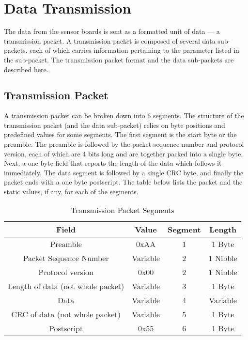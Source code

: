 \section{Data Transmission} \label{section:overall}

The data from the sensor boards is sent as a formatted unit of data --- a transmission
packet. A transmission packet is composed of several data sub-packets, each
of which carries information pertaining to the parameter listed in the sub-packet.
The transmission packet format and the data sub-packets are described here.

\subsection{Transmission Packet}
A transmission packet can be broken down into 6 segments.
The structure of the transmission packet (and the data sub-packet) relies on
byte positions and predefined values for some segments. The first segment
is the start byte or
the preamble. The preamble is followed by the packet sequence number and protocol
version, each of which are 4 bits long and are together packed into a single byte.
Next, a one byte field that reports the length of the data which follows it
immediately. The data segment is
followed by a single CRC byte, and finally the packet ends with a one byte
postscript. The table below lists the packet and the static values, if any,
for each of the segments.

\begin{table}[H]
    \centering
    {
    \begin{tabular}{|c|c|c|c|}
        \hline
        \textbf{Field} & \textbf{Value} & \textbf{Segment} & \textbf{Length}\\
        \hline
        \hline
        Preamble & 0xAA & 1 & 1 Byte\\
        Packet Sequence Number & Variable & 2 & 1 Nibble\\
        Protocol version & 0x00 & 2 & 1 Nibble\\
        Length of data (not whole packet) & Variable & 3 & 1 Byte\\
        Data & Variable & 4 & Variable \\
        CRC of data (not whole packet) & Variable & 5 & 1 Byte\\
        Postscript & 0x55 & 6 & 1 Byte\\
        \hline
    \end{tabular}
    }
    \caption{Transmission Packet Segments}
    \label{table:packsegments}
\end{table}


